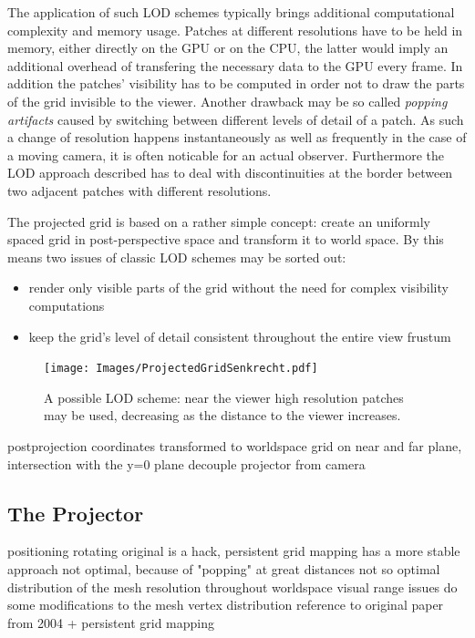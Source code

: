 The application of such LOD schemes typically brings additional computational
complexity and memory usage. Patches at different resolutions have to be held
in memory, either directly on the GPU or on the CPU, the latter would imply an
additional overhead of transfering the necessary data to the GPU every frame.
In addition the patches' visibility has to be computed in order not to draw the
parts of the grid invisible to the viewer. Another drawback may be so called
\textit{popping artifacts} caused by switching between different levels of
detail of a patch. As such a change of resolution happens instantaneously as
well as frequently in the case of a moving camera, it is often noticable for an
actual observer. Furthermore the LOD approach described has to deal with
discontinuities at the border between two adjacent patches with different
resolutions.

The projected grid is based on a rather simple concept: create an uniformly
spaced grid in post-perspective space and transform it to world space. By this
means two issues of classic LOD schemes may be sorted out:
\begin{itemize}
 \item render only visible parts of the grid without the need for complex
visibility computations
 \item keep the grid's level of detail consistent throughout the entire view
frustum
\end{itemize}


\begin{figure}
\begin{center}
\texttt{[image: Images/ProjectedGridSenkrecht.pdf]}
\caption[Projected Grid Vertical]{A possible LOD scheme: near the viewer high
resolution patches may be used, decreasing as the distance to the viewer
increases. }
\label{fig:projgridv}
\end{center}
\end{figure}

postprojection coordinates transformed to worldspace
grid on near and far plane, intersection with the y=0 plane
decouple projector from camera

\subsection{The Projector}
positioning
rotating
original is a hack, persistent grid mapping has a more stable approach
not optimal, because of "popping" at great distances
not so optimal distribution of the mesh resolution throughout worldspace
visual range issues
do some modifications to the mesh vertex distribution
reference to original paper from 2004 + persistent grid mapping

